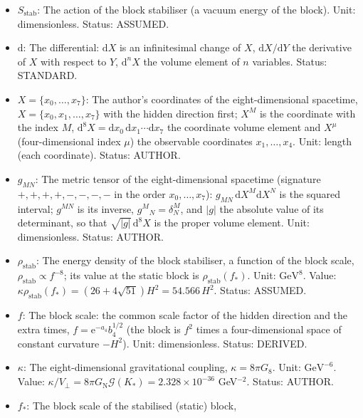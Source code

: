 \documentclass[
  10pt,
]{article}
\providecommand{\tightlist}{%
  \setlength{\itemsep}{0pt}\setlength{\parskip}{0pt}}
\begin{document}
\begin{itemize}
\tightlist
\item
  \(S_{\mathrm{stab}}\): The action of the block stabiliser (a vacuum
  energy of the block). Unit: dimensionless. Status: ASSUMED.
\item
  \(\mathrm{d}\): The differential: \(\mathrm{d}X\) is an infinitesimal
  change of \(X\), \(\mathrm{d}X/\mathrm{d}Y\) the derivative of \(X\)
  with respect to \(Y\), \(\mathrm{d}^nX\) the volume element of \(n\)
  variables. Status: STANDARD.
\item
  \(X = \{x_0, \dots, x_7\}\): The author's coordinates of the
  eight-dimensional spacetime, \(X = \{x_0, x_1, \dots, x_7\}\) with the
  hidden direction first; \(X^M\) is the coordinate with the index
  \(M\),
  \(\mathrm{d}^8X = \mathrm{d}x_0\,\mathrm{d}x_1\cdots\mathrm{d}x_7\)
  the coordinate volume element and \(X^\mu\) (four-dimensional index
  \(\mu\)) the observable coordinates \(x_1, \dots, x_4\). Unit: length
  (each coordinate). Status: AUTHOR.
\item
  \(g_{MN}\): The metric tensor of the eight-dimensional spacetime
  (signature \(+,+,+,+,-,-,-,-\) in the order \(x_0, \dots, x_7\)):
  \(g_{MN}\,\mathrm{d}X^M\mathrm{d}X^N\) is the squared interval;
  \(g^{MN}\) is its inverse, \(g^M{}_N = \delta^M_N\), and
  \(\lvert g\rvert\) the absolute value of its determinant, so that
  \(\sqrt{\lvert g\rvert}\,\mathrm{d}^8X\) is the proper volume element.
  Unit: dimensionless. Status: AUTHOR.
\item
  \(\rho_{\mathrm{stab}}\): The energy density of the block stabiliser,
  a function of the block scale,
  \(\rho_{\mathrm{stab}} \propto f^{-8}\); its value at the static block
  is \(\rho_{\mathrm{stab}}(f_*)\). Unit: \(\mathrm{GeV}^{8}\). Value:
  \(\kappa\rho_{\mathrm{stab}}(f_*) = (26 + 4\sqrt{51})H^2 = 54.566\,H^2\).
  Status: ASSUMED.
\item
  \(f\): The block scale: the common scale factor of the hidden
  direction and the extra times, \(f = \mathrm{e}^{-a_4}b_4^{1/2}\) (the
  block is \(f^2\) times a four-dimensional space of constant curvature
  \(-H^2\)). Unit: dimensionless. Status: DERIVED.
\item
  \(\kappa\): The eight-dimensional gravitational coupling,
  \(\kappa = 8\pi G_8\). Unit: \(\mathrm{GeV}^{-6}\). Value:
  \(\kappa/V_\perp = 8\pi G_{\mathrm{N}}\mathcal{G}(K_*) = 2.328\times10^{-36}\)
  GeV\(^{-2}\). Status: AUTHOR.
\item
  \(f_*\): The block scale of the stabilised (static) block,

\end{itemize}
\end{document}
